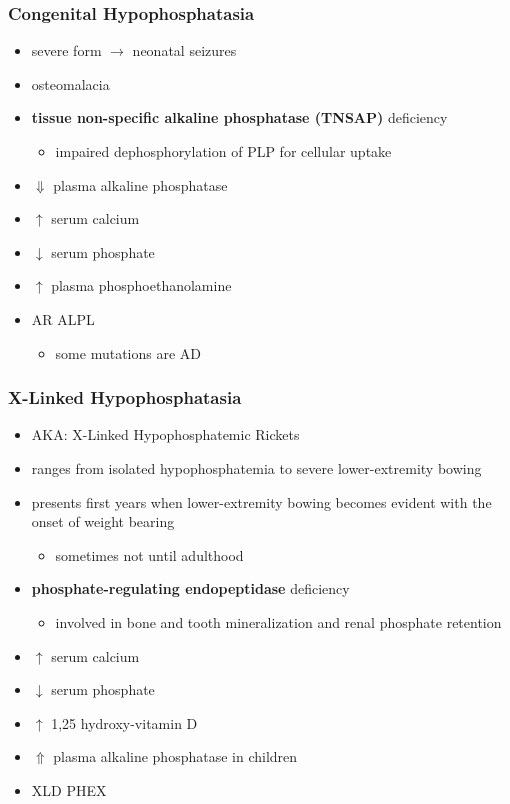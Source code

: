 \documentclass[12pt]{scrartcl}
\begin{document}
\subsubsection{Congenital Hypophosphatasia}
\label{sec:orgaf1b3a6}
\begin{itemize}
\item severe form \(\to\) neonatal seizures
\item osteomalacia
\item \textbf{tissue non-specific alkaline phosphatase (TNSAP)} deficiency
\begin{itemize}
\item impaired dephosphorylation of PLP for cellular uptake
\end{itemize}
\item \(\Downarrow\) plasma alkaline phosphatase
\item \(\uparrow\) serum calcium
\item \(\downarrow\) serum phosphate
\item \(\uparrow\) plasma phosphoethanolamine
\item AR ALPL
\begin{itemize}
\item some mutations are AD
\end{itemize}
\end{itemize}

\subsubsection{X-Linked Hypophosphatasia}
\label{sec:orgf858a27}
\begin{itemize}
\item AKA: X-Linked Hypophosphatemic Rickets
\item ranges from isolated hypophosphatemia to severe lower-extremity bowing
\item presents first  years when lower-extremity bowing becomes
evident with the onset of weight bearing
\begin{itemize}
\item sometimes not until adulthood
\end{itemize}
\item \textbf{phosphate-regulating endopeptidase} deficiency
\begin{itemize}
\item involved in bone and tooth mineralization and renal phosphate retention
\end{itemize}
\item \(\uparrow\) serum calcium
\item \(\downarrow\) serum phosphate
\item \(\uparrow\) 1,25 hydroxy-vitamin D
\item \(\Uparrow\) plasma alkaline phosphatase in children
\item XLD PHEX
\end{itemize}
\end{document}
